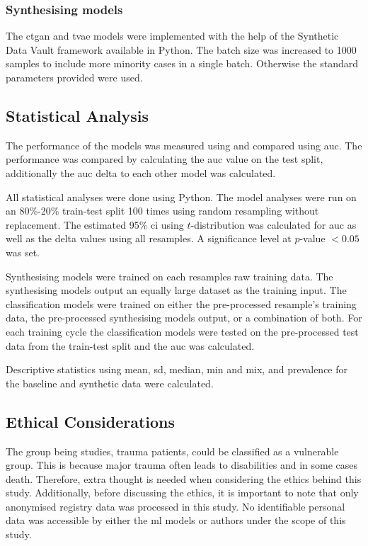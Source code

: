 \documentclass[12pt, letterpaper]{article}
\begin{document}
\subsubsection*{Synthesising models}
The \acrfull{ctgan} \cite{xu_modeling_2019} and \acrfull{tvae} \cite{ishfaq_tvae_2018} models were implemented with the help of the Synthetic Data Vault framework \cite{patki_sdv_2016} available in Python. The batch size was increased to 1000 samples to include more minority cases in a single batch. Otherwise the standard parameters provided were used.

\subsection{Statistical Analysis}
The performance of the models was measured using and compared using \acrfull{auc}. The performance was compared by calculating the \acrshort{auc} value on the test split, additionally the \acrshort{auc} delta to each other model was calculated.

All statistical analyses were done using Python. The model analyses were run on an 80\%-20\% train-test split 100 times using random resampling without replacement. The estimated 95\% \acrfull{ci} using $t$-distribution was calculated for \acrshort{auc} as well as the delta values using all resamples. A significance level at $p$-value $< 0.05$ was set.

Synthesising models were trained on each resamples raw training data. The synthesising models output an equally large dataset as the training input. The classification models were trained on either the pre-processed resample's training data, the pre-processed synthesising models output, or a combination of both. For each training cycle the classification models were tested on the pre-processed test data from the train-test split and the \acrshort{auc} was calculated.

Descriptive statistics using mean, \acrfull{sd}, median, min and mix, and prevalence for the baseline and synthetic data were calculated.


\subsection{Ethical Considerations}
The group being studies, trauma patients, could be classified as a vulnerable group. This is because major trauma often leads to disabilities and in some cases death. Therefore, extra thought is needed when considering the ethics behind this study. Additionally, before discussing the ethics, it is important to note that only anonymised registry data was processed in this study. No identifiable personal data was accessible by either the \acrshort{ml} models or authors under the scope of this study.
\end{document}
